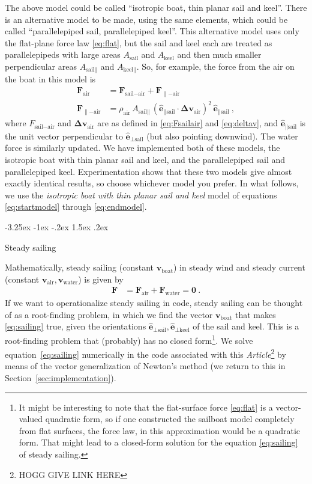 \documentclass[letterpaper]{article}
\makeatletter
\renewcommand{\vec}[1]{\boldsymbol{#1}}
\newcommand{\uvec}{\vec{\hat{e}}}
\newcommand{\air}{\text{air}}
\newcommand{\water}{\text{water}}
\newcommand{\boat}{\text{boat}}
\newcommand{\sail}{\text{sail}}
\newcommand{\keel}{\text{keel}}
\newcommand{\vair}{\vec{v}_\air}
\newcommand{\vwater}{\vec{v}_\water}
\newcommand{\vboat}{\vec{v}_\boat}
\newcommand{\documentname}{\textsl{Article}}
\newcommand{\secref}[1]{Section~\ref{#1}}
\renewcommand\section{\@startsection {section}{1}{\z@}%
  {-3.25ex \@plus -1ex \@minus -.2ex}%
  {1.5ex \@plus .2ex}%
  {\raggedright\normalfont\large\bfseries}}
\makeatother
\begin{document}
The above model could be called ``isotropic boat, thin planar sail and keel''.
There is an alternative model to be made, using the same elements, which could be called ``parallelepiped sail, parallelepiped keel''.
This alternative model uses only the flat-plane force law \eqref{eq:flat}, but the sail and keel each are treated as parallelepipeds with large areas $A_\sail$ and $A_\keel$ and then much smaller perpendicular areas $A_{\sail\parallel}$ and $A_{\keel\parallel}$.
So, for example, the force from the air on the boat in this model is
\begin{align}
  \vec{F}_\air &= \vec{F}_{\sail-\air} + \vec{F}_{\parallel-\air}
  \\
  \vec{F}_{\parallel-\air} & = \rho_\air\,A_{\sail\parallel}\,(\uvec_{\parallel\sail}\cdot\vec{\Delta v}_\air)^2\,\uvec_{\parallel\sail}
   ~,
\end{align}
where $F_{\sail-\air}$ and $\vec{\Delta v}_\air$ are as defined in \eqref{eq:Fsailair} and \eqref{eq:deltav}, and $\uvec_{\parallel\sail}$ is the unit vector perpendicular to $\uvec_{\perp\sail}$ (but also pointing downwind).
The water force is similarly updated.
We have implemented both of these models, the isotropic boat with thin planar sail and keel, and the parallelepiped sail and parallelepiped keel.
Experimentation shows that these two models give almost exactly identical results, so choose whichever model you prefer.
In what follows, we use the \emph{isotropic boat with thin planar sail and keel} model of equations \eqref{eq:startmodel} through \eqref{eq:endmodel}.

\section{Steady sailing}\label{sec:steady}

Mathematically, steady sailing (constant $\vboat$) in steady wind and steady current (constant $\vair, \vwater$) is given by
\begin{align}\label{eq:sailing}
    \vec{F} &= \vec{F}_\air + \vec{F}_\water = \vec{0} ~.
\end{align}
If we want to operationalize steady sailing in code, steady sailing can be thought of as a root-finding problem, in which we find the vector $\vboat$ that makes \eqref{eq:sailing} true, given the orientations $\uvec_{\perp\sail}, \uvec_{\perp\keel}$ of the sail and keel.
This is a root-finding problem that (probably) has no closed form\footnote{%
It might be interesting to note that the flat-surface force \eqref{eq:flat} is a vector-valued quadratic form, so if one constructed the sailboat model completely from flat surfaces, the force law, in this approximation would be a quadratic form.
That might lead to a closed-form solution for the equation \eqref{eq:sailing} of steady sailing.}.
We solve equation~\eqref{eq:sailing} numerically in the code associated with this \documentname\footnote{%
HOGG GIVE LINK HERE}
by means of the vector generalization of Newton's method (we return to this in \secref{sec:implementation}).
\end{document}
